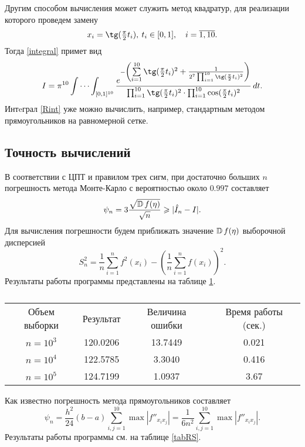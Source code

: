 	Другим способом вычисления может служить метод квадратур, для реализации 
	которого проведем замену
	\begin{equation*}
		x_i = \tg (\tfrac{\pi}{2}t_i),\: t_i \in [0,1],\quad i = \overline{1,10}.
	\end{equation*}
	Тогда \eqref{integral} примет вид 
	\begin{equation}\label{Rint}
		I = \pi^{10} \idotsint_{[0,1]^{10}} \frac
		{e^{-\biggl(\textstyle{ \sum\limits_{i=1}^{10} \tg (\frac{\pi}{2}t_i)^2 + 
		\frac{1}{2^7 \prod_{i=1}^{10}\tg(\frac{\pi}{2}t_i)^2} }\biggr)}}
		{\prod_{i=1}^{10}\tg(\frac{\pi}{2}t_i)^2 \cdot 
		\prod_{i=1}^{10}\cos(\frac{\pi}{2}t_i)^2} \, dt.
	\end{equation}
	Интeграл \eqref{Rint} уже можно вычислить, например, стандартным методом 
	прямоугольников на равномерной сетке.

\subsection{Точность вычислений}
	В соответствии с ЦПТ и правилом трех сигм, при достаточно больших $n$ 
	погрешность метода Монте-Карло с вероятностью около $0.997$ составляет
	\begin{equation*}
		\psi_n = 3\frac{\sqrt{\operatorname{\mathbb{D}}{f(\eta)}}} {\sqrt{n}} \geqslant |\hat I_n - I|.
	\end{equation*}
	Для вычисления погрешности будем приближать значение $\operatorname{\mathbb{D}}{f(\eta)}$ 
	выборочной дисперсией 
	\begin{equation*}
		S_n^2 = \frac{1}{n} \sum_{i = 1}^n f^2(x_i) - \left( \frac{1}{n}
 \sum_{i = 1}^n f(x_i) \right)^2.
	\end{equation*}
	Результаты работы программы представлены на таблице \ref{tabMC}.
	
	\begin{table}[ht]
	\begin{tabular}{|cccc}
		Объем выборки & Результат & Величина ошибки & Время работы (сек.) \\[5pt]
		$n=10^3$      & 120.0206  & 13.7449         & 0.021               \\
		$n=10^4$      & 122.5785  & 3.3040          & 0.416                \\
		$n=10^5$      & 124.7199  & 1.0937          & 3.67                 \\
	\end{tabular}
	\caption{}
	\label{tabMC}
	\end{table}
	
	Как известно погрешность метода прямоугольников составляет 
	\begin{equation*}
		\psi_n = \frac{h^2}{24} (b-a) \sum\limits_{i,j = 1}^{10} 
		\max |f''_{x_i x_j} | = 
		\frac{1}{6n^2} \sum\limits_{i,j = 1}^{10} \max |f''_{x_i x_j} |.
	\end{equation*}
	Результаты работы программы см. на таблице \ref{tabRS}.

